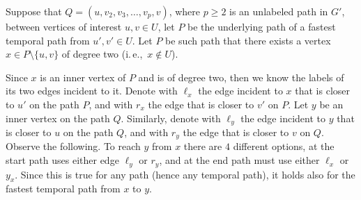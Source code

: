 \documentclass[11pt,a4paper]{article}
\theoremstyle{remark}
\theoremstyle{definition}
\newcommand{\ie}{i.\,e.,\ }
\begin{document}
Suppose that $Q = (u,v_2,v_3, \dots, v_p, v)$, where $p \geq 2$ is an unlabeled path in $G'$, between vertices of interest $u,v \in U$,
let $P$ be the underlying path of a fastest temporal path from $u',v' \in U$.
Let $P$ be such path that there exists a vertex $x \in P \setminus \{u,v\}$ of degree two (\ie $x\notin U$).

Since $x$ is an inner vertex of $P$ and is of degree two, then we know the labels of its two edges incident to it.
Denote with $\ell_x$ the edge incident to $x$ that is closer to $u'$ on the path $P$, and with $r_x$ the edge that is closer to $v'$ on $P$.
Let $y$ be an inner vertex on the path $Q$.
Similarly, denote with $\ell_y$ the edge incident to $y$ that is closer to $u$ on the path $Q$, and with $r_y$ the edge that is closer to $v$ on $Q$.
Observe the following. 
To reach $y$ from $x$ there are $4$ different options, at the start path uses either edge $\ell_y$ or $r_y$, 
and at the end path must use either $\ell_x$ or $y_x$.
Since this is true for any path (hence any temporal path), it holds also for the fastest temporal path from $x$ to $y$.
\end{document}
